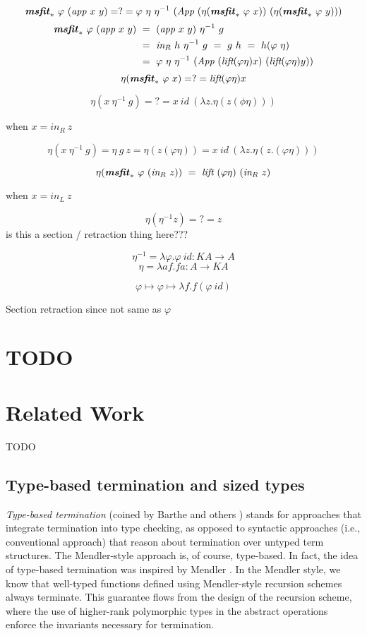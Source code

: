 \documentclass[a4paper,UKenglish]{lipics}
\newcommand{\ie}[0]{{i.e.}}
\newcommand{\msfit}[1]{\ensuremath{\textbf{\textit{msfit}}_{#1}}}
\newcommand{\lift}[0]{\textit{lift}}
\newcommand{\inL}[0]{\textit{in}_{L}}
\newcommand{\inR}[0]{\textit{in}_{R}}
\begin{document}
\[ \msfit{*}~\varphi~(\textit{app}~x~y)
=?= \varphi~\eta~\eta^{-1}
	~(\textit{App}~(\eta(\msfit{*}~\varphi~x))~(\eta(\msfit{*}~\varphi~y)))
\]
\begin{align*}
\msfit{*}~\varphi~(\textit{app}~x~y)
&~=~ (\textit{app}~x~y)~\eta^{-1}~g \\
&~=~ \inR~h~\eta^{-1}~g ~=~ g~h ~=~ h(\varphi~\eta) \\
&~=~ \varphi~\eta~\eta^{-1}
     ~(\textit{App}~(\lift(\varphi\eta)x)~(\lift(\varphi\eta)y))
\end{align*}
\[ \eta(\msfit{*}~\varphi~x) =?= \lift(\varphi\eta)x \]



\[ \eta(x~\eta^{-1}~g) =?= x~\textit{id}~(\lambda z.\eta(z(\phi\eta))) \]

when $x = \inR~z$

\[
	\eta(x~\eta^{-1}~g) = \eta~g~z = \eta(z(\varphi\eta))
	= x~\textit{id}~(\lambda z.\eta(z.(\varphi\eta)))
\]


\[ \eta(\msfit{*}~\varphi~(\inR~z)) ~=~ \lift~(\varphi\eta)~(\inR~z) \]



when $x = \inL~z$

\[ \eta(\eta^{-1}z) =?= z \]
is this a section / retraction thing here???

\[\eta^{-1} = \lambda \varphi.\varphi~\textit{id} : KA \to A\]
\[ \eta = \lambda a f.f a : A \to KA \]

\[ \varphi \mapsto \varphi \mapsto \lambda f . f(\varphi~\textit{id}) \]

Section retraction since not same as $\varphi$

\section{TODO}


\section{Related Work}
TODO

\subsection{Type-based termination and sized types}\label{sec:relwork:sized}
\emph{Type-based termination} (coined by Barthe and others \cite{BartheFGPU04})
stands for approaches that integrate termination into type checking,
as opposed to syntactic approaches (\ie, conventional approach) that
reason about termination over untyped term structures.
The Mendler-style approach is, of course, type-based. In fact, the idea of
type-based termination was inspired by Mendler \cite{Mendler87,Mendler91}.
In the Mendler style, we know that well-typed functions defined using
Mendler-style recursion schemes always terminate.  This guarantee flows
from the design of the recursion scheme, where the use of higher-rank 
polymorphic types in the abstract operations enforce the invariants
necessary for termination.
\end{document}
